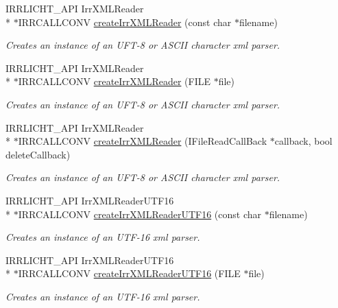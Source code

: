 \begin{DoxyCompactItemize}
I\-R\-R\-L\-I\-C\-H\-T\-\_\-\-A\-P\-I Irr\-X\-M\-L\-Reader \\*
$\ast$I\-R\-R\-C\-A\-L\-L\-C\-O\-N\-V \hyperlink{namespaceirr_1_1io_a581f4d4648398759c61266d63d7106b1}{create\-Irr\-X\-M\-L\-Reader} (const char $\ast$filename)
\begin{DoxyCompactList}\small\item\em Creates an instance of an U\-F\-T-\/8 or A\-S\-C\-I\-I character xml parser. \end{DoxyCompactList}\item 
I\-R\-R\-L\-I\-C\-H\-T\-\_\-\-A\-P\-I Irr\-X\-M\-L\-Reader \\*
$\ast$I\-R\-R\-C\-A\-L\-L\-C\-O\-N\-V \hyperlink{namespaceirr_1_1io_a9c0ebca5a4addfcfd90f51b5131f7d56}{create\-Irr\-X\-M\-L\-Reader} (F\-I\-L\-E $\ast$file)
\begin{DoxyCompactList}\small\item\em Creates an instance of an U\-F\-T-\/8 or A\-S\-C\-I\-I character xml parser. \end{DoxyCompactList}\item 
I\-R\-R\-L\-I\-C\-H\-T\-\_\-\-A\-P\-I Irr\-X\-M\-L\-Reader \\*
$\ast$I\-R\-R\-C\-A\-L\-L\-C\-O\-N\-V \hyperlink{namespaceirr_1_1io_a25e8dfa2b6cfb7fe9e83cb38811b8e89}{create\-Irr\-X\-M\-L\-Reader} (I\-File\-Read\-Call\-Back $\ast$callback, bool delete\-Callback)
\begin{DoxyCompactList}\small\item\em Creates an instance of an U\-F\-T-\/8 or A\-S\-C\-I\-I character xml parser. \end{DoxyCompactList}\item 
I\-R\-R\-L\-I\-C\-H\-T\-\_\-\-A\-P\-I Irr\-X\-M\-L\-Reader\-U\-T\-F16 \\*
$\ast$I\-R\-R\-C\-A\-L\-L\-C\-O\-N\-V \hyperlink{namespaceirr_1_1io_a86473ef152c15b685af181a4c5461a5d}{create\-Irr\-X\-M\-L\-Reader\-U\-T\-F16} (const char $\ast$filename)
\begin{DoxyCompactList}\small\item\em Creates an instance of an U\-T\-F-\/16 xml parser. \end{DoxyCompactList}\item 
I\-R\-R\-L\-I\-C\-H\-T\-\_\-\-A\-P\-I Irr\-X\-M\-L\-Reader\-U\-T\-F16 \\*
$\ast$I\-R\-R\-C\-A\-L\-L\-C\-O\-N\-V \hyperlink{namespaceirr_1_1io_a7e7ecf8350b446da3a4080f3949bc0b1}{create\-Irr\-X\-M\-L\-Reader\-U\-T\-F16} (F\-I\-L\-E $\ast$file)
\begin{DoxyCompactList}\small\item\em Creates an instance of an U\-T\-F-\/16 xml parser. \end{DoxyCompactList}\item 

\end{DoxyCompactItemize}
